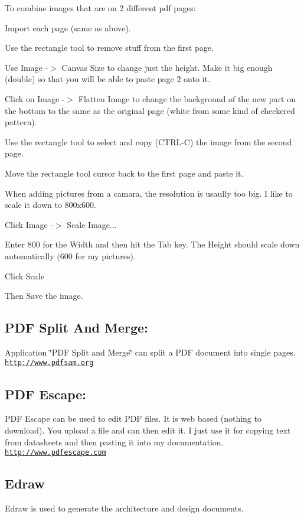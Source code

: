 To combine images that are on 2 different pdf pages\+:
\begin{DoxyItemize}
\item Import each page (same as above).
\item Use the rectangle tool to remove stuff from the first page.
\item Use Image -\/$>$ Canvas Size to change just the height. Make it big enough (double) so that you will be able to paste page 2 onto it.
\item Click on Image -\/$>$ Flatten Image to change the background of the new part on the bottom to the same as the original page (white from some kind of checkered pattern).
\item Use the rectangle tool to select and copy (C\+T\+R\+L-\/\+C) the image from the second page.
\item Move the rectangle tool cursor back to the first page and paste it.
\end{DoxyItemize}

When adding pictures from a camara, the resolution is usaully too big. I like to scale it down to 800x600.
\begin{DoxyItemize}
\item Click Image -\/$>$ Scale Image...
\item Enter 800 for the Width and then hit the Tab key. The Height should scale down automatically (600 for my pictures).
\item Click Scale
\item Then Save the image.
\end{DoxyItemize}\hypertarget{index_PDFS}{}\subsection{P\+D\+F Split And Merge\+:}\label{index_PDFS}
Application \char`\"{}\+P\+D\+F Split and Merge\char`\"{} can split a P\+D\+F document into single pages. \href{http://www.pdfsam.org}{\tt http\+://www.\+pdfsam.\+org}\hypertarget{index_PDFE}{}\subsection{P\+D\+F Escape\+:}\label{index_PDFE}
P\+D\+F Escape can be used to edit P\+D\+F files. It is web based (nothing to download). You upload a file and can then edit it. I just use it for copying text from datasheets and then pasting it into my documentation. \href{http://www.pdfescape.com}{\tt http\+://www.\+pdfescape.\+com}\hypertarget{index_Edraw}{}\subsection{Edraw}\label{index_Edraw}
Edraw is used to generate the architecture and design documents.


